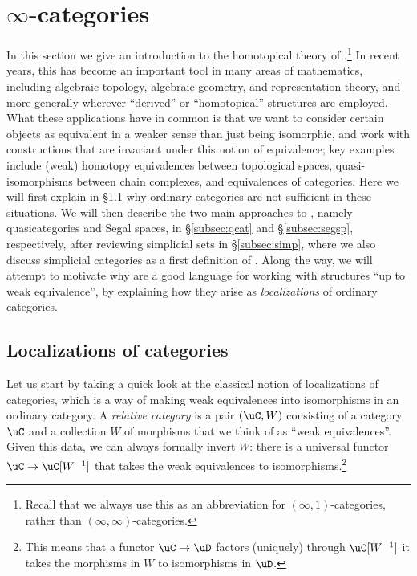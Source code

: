 \documentclass[a4paper,12pt]{article}
\begin{document}
\section{$\infty$-categories}\label{sec:icat}
In this section we give an introduction to the homotopical theory of
\icats{}.\footnote{Recall that we always use this as an abbreviation
  for $(\infty,1)$-categories, rather than
  $(\infty,\infty)$-categories.} In recent years, this has become an
important tool in many areas of mathematics, including algebraic
topology, algebraic geometry, and representation theory, and more
generally wherever ``derived'' or ``homotopical'' structures are
employed.  What these applications have in common is that we want to
consider certain objects as equivalent in a weaker sense than just
being isomorphic, and work with constructions that are invariant under
this notion of equivalence; key examples include (weak) homotopy
equivalences between topological spaces, quasi-isomorphisms between
chain complexes, and equivalences of categories. Here we will first
explain in \S\ref{subsec:loc} why ordinary categories are not
sufficient in these situations.  We will then describe the two main
approaches to \icats{}, namely quasicategories and Segal spaces, in
\S\ref{subsec:qcat} and \S\ref{subsec:segsp}, respectively, after
reviewing simplicial sets in \S\ref{subsec:simp}, where we also
discuss simplicial categories as a first definition of \icats{}. Along
the way, we will attempt to motivate why \icats{} are a good language
for working with structures ``up to weak equivalence'', by explaining
how they arise as \emph{localizations} of ordinary categories.



\subsection{Localizations of categories}\label{subsec:loc}
Let us start by taking a quick look at the classical notion of
localizations of categories, which is a way of making weak
equivalences into isomorphisms in an ordinary category.  A
\emph{relative category} is a pair $(\uC, W)$ consisting of a category
$\uC$ and a collection $W$ of morphisms that we think of as ``weak
equivalences''. Given this data, we can always formally invert $W$:
there is a universal functor $\uC \to \uC[W^{-1}]$ that takes the weak
equivalences to isomorphisms.\footnote{This means that a functor
  $\uC \to \uD$ factors (uniquely) through $\uC[W^{-1}]$ \IFF{} it
  takes the morphisms in $W$ to isomorphisms in $\uD$.}
\end{document}
